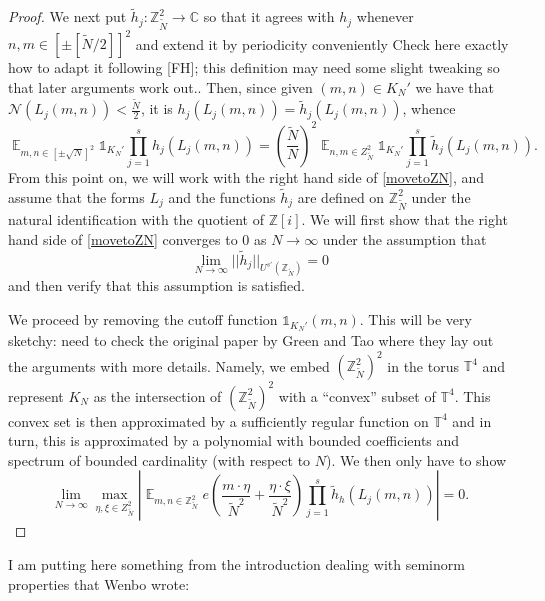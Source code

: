 \documentclass[11pt]{amsart}
\theoremstyle{definition}
\DeclareMathOperator*{\E}{\mathbb{E}}
\newcommand{\C}{{\mathbb C}}
\newcommand{\NN}{{\mathcal N}}
\newcommand{\Z}{{\mathbb Z}}
\begin{document}
\begin{proof}
We next put $\tilde{h}_j: \Z_{\tilde{N}}^2 \to \C$ so that it agrees with $h_j$ whenever $n,m \in [\pm [\tilde{N}/2]]^2$ and extend it by periodicity conveniently {\color{red} Check here exactly how to adapt it following [FH]; this definition may need some slight tweaking so that later arguments work out.}. Then, since given $(m,n) \in K_N'$ we have that $\NN(L_j(m,n))<\frac{\tilde{N}}{2}$, it is $h_j(L_j(m,n))=\tilde{h}_j(L_j(m,n))$, whence
\begin{equation}\label{movetoZN}
    \E_{m,n \in [\pm \sqrt{N}]^2} \mathds{1}_{K_N'} \prod_{j=1}^s h_j(L_j(m,n)) = \left(\frac{\tilde{N}}{N}\right)^2 \E_{n,m \in Z_{\tilde{N}}^2} \mathds{1}_{K_N'} \prod_{j=1}^s \tilde{h}_j(L_j(m,n)).
\end{equation}
From this point on, we will work with the right hand side of \eqref{movetoZN}, and assume that the forms $L_j$ and the functions $\tilde{h}_j$ are defined on $\Z_{\tilde{N}}^2$ under the natural identification with the quotient of $\Z[i]$. We will first show that the right hand side of \eqref{movetoZN} converges to $0$ as $N \to \infty$ under the assumption that
\begin{equation}\label{limitgowers0}
    \lim_{N \to \infty} ||\tilde{h}_j||_{U^{s'}(\Z_{\tilde{N}})} = 0
\end{equation}
and then verify that this assumption is satisfied.

We proceed by removing the cutoff function $\mathds{1}_{K_N'}(m,n)$. {\color{red} This will be very sketchy: need to check the original paper by Green and Tao where they lay out the arguments with more details}. Namely, we embed $(\Z_{\tilde{N}}^2)^2$ in the torus $\mathbb{T}^4$ and represent $K_{N}$ as the intersection of $(\Z_{\tilde{N}}^2)^2$ with a ``convex'' subset of $\mathbb{T}^4$. This convex set is then approximated by a sufficiently regular function on $\mathbb{T}^4$ and in turn, this is approximated by a polynomial with bounded coefficients and spectrum of bounded cardinality (with respect to $N$). We then only have to show 
\[
\lim_{N \to \infty} \max_{\eta, \xi \in Z_{\tilde{N}}^2} \left| \E_{m, n \in \Z_{\tilde{N}}^2} e\left( \frac{m\cdot\eta}{\tilde{N}^2}+\frac{\eta\cdot\xi}{\tilde{N}^2}\right) \prod_{j=1}^s \tilde{h}_h(L_j(m,n)) \right| = 0.
\]
\fi
\end{proof}

I am putting here something from the introduction dealing with seminorm properties that Wenbo wrote:
\end{document}
